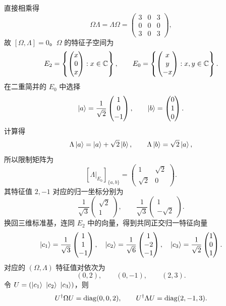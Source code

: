 \begin{checkedsolution}
直接相乘得
\[
  \Omega\Lambda=\Lambda\Omega
  =\begin{pmatrix}3&0&3\\0&0&0\\3&0&3\end{pmatrix},
\]
故 $[\Omega,\Lambda]=0$。$\Omega$ 的特征子空间为
\[
  E_2=\left\{
    \begin{pmatrix}x\\0\\x\end{pmatrix}:x\in\mathbb{C}
  \right\},
  \qquad
  E_0=\left\{
    \begin{pmatrix}x\\y\\-x\end{pmatrix}:x,y\in\mathbb{C}
  \right\}.
\]
在二重简并的 $E_0$ 中选择
\[
  \left|a\right\rangle=\frac1{\sqrt2}\begin{pmatrix}1\\0\\-1\end{pmatrix},
  \qquad
  \left|b\right\rangle=\begin{pmatrix}0\\1\\0\end{pmatrix}.
\]
计算得
\[
  \Lambda\left|a\right\rangle=\left|a\right\rangle+\sqrt2\left|b\right\rangle,
  \qquad
  \Lambda\left|b\right\rangle=\sqrt2\left|a\right\rangle,
\]
所以限制矩阵为
\[
  [\Lambda|_{E_0}]_{\{a,b\}}
  =\begin{pmatrix}1&\sqrt2\\\sqrt2&0\end{pmatrix}.
\]
其特征值 $2,-1$ 对应的归一坐标分别为
\[
  \frac1{\sqrt3}\begin{pmatrix}\sqrt2\\1\end{pmatrix},
  \qquad
  \frac1{\sqrt3}\begin{pmatrix}1\\-\sqrt2\end{pmatrix}.
\]
换回三维标准基，连同 $E_2$ 中的向量，得到共同正交归一特征向量
\[
  \left|c_1\right\rangle=\frac1{\sqrt3}\begin{pmatrix}1\\1\\-1\end{pmatrix},
  \quad
  \left|c_2\right\rangle=\frac1{\sqrt6}\begin{pmatrix}1\\-2\\-1\end{pmatrix},
  \quad
  \left|c_3\right\rangle=\frac1{\sqrt2}\begin{pmatrix}1\\0\\1\end{pmatrix}.
\]
对应的 $(\Omega,\Lambda)$ 特征值对依次为
\[
  (0,2),\qquad(0,-1),\qquad(2,3).
\]
令 $U=(\ket{c_1}\ \ket{c_2}\ \ket{c_3})$，则
\[
  U^\dagger\Omega U=\operatorname{diag}(0,0,2),
  \qquad
  U^\dagger\Lambda U=\operatorname{diag}(2,-1,3).
\]
\end{checkedsolution}

